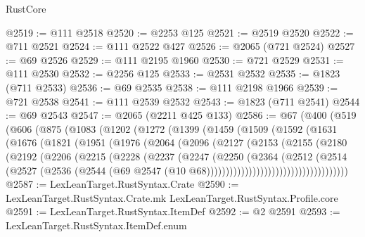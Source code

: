 \begin{lexlean}{RustCore}
\begin{coremodule}
@2519 := @111 @2518
@2520 := @2253 @125
@2521 := @2519 @2520
@2522 := @711 @2521
@2524 := @111 @2522 @427
@2526 := @2065 (@721 @2524)
@2527 := @69 @2526
@2529 := @111 @2195 @1960
@2530 := @721 @2529
@2531 := @111 @2530
@2532 := @2256 @125
@2533 := @2531 @2532
@2535 := @1823 (@711 @2533)
@2536 := @69 @2535
@2538 := @111 @2198 @1966
@2539 := @721 @2538
@2541 := @111 @2539 @2532
@2543 := @1823 (@711 @2541)
@2544 := @69 @2543
@2547 := @2065 (@2211 @425 @133)
@2586 := @67
    (@400
      (@519
        (@606
          (@875
            (@1083
              (@1202
                (@1272
                  (@1399
                    (@1459
                      (@1509
                        (@1592
                          (@1631
                            (@1676
                              (@1821
                                (@1951
                                  (@1976
                                    (@2064
                                      (@2096
                                        (@2127
                                          (@2153
                                            (@2155
                                              (@2180
                                                (@2192
                                                  (@2206
                                                    (@2215
                                                      (@2228
                                                        (@2237
                                                          (@2247
                                                            (@2250
                                                              (@2364
                                                                (@2512
                                                                  (@2514
                                                                    (@2527
                                                                      (@2536
                                                                        (@2544
                                                                          (@69
                                                                            @2547
                                                                            (@10
                                                                              @68)))))))))))))))))))))))))))))))))))))
@2587 := LexLeanTarget.RustSyntax.Crate
@2590 := LexLeanTarget.RustSyntax.Crate.mk LexLeanTarget.RustSyntax.Profile.core
@2591 := LexLeanTarget.RustSyntax.ItemDef
@2592 := @2 @2591
@2593 := LexLeanTarget.RustSyntax.ItemDef.enum

\end{coremodule}
\end{lexlean}

